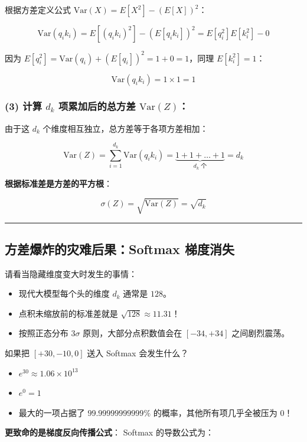 根据方差定义公式 $\text{Var}(X) = E[X^2] - (E[X])^2$：

\[
\text{Var}(q_i k_i) = E[(q_i k_i)^2] - (E[q_i k_i])^2 = E[q_i^2] E[k_i^2] - 0
\]

因为 $E[q_i^2] = \text{Var}(q_i) + (E[q_i])^2 = 1 + 0 = 1$，同理 $E[k_i^2] = 1$：

\[
\text{Var}(q_i k_i) = 1 \times 1 = 1
\]

\subsubsection{(3) 计算 $d_k$ 项累加后的总方差 $\text{Var}(Z)$：}

由于这 $d_k$ 个维度相互独立，总方差等于各项方差相加：

\[
\text{Var}(Z) = \sum_{i=1}^{d_k} \text{Var}(q_i k_i) = \underbrace{1 + 1 + \dots + 1}_{d_k \text{ 个}} = d_k
\]

\textbf{根据标准差是方差的平方根}：

\[
\sigma(Z) = \sqrt{\text{Var}(Z)} = \sqrt{d_k}
\]

\vspace{0.8em}\hrule\vspace{0.8em}

\subsection{方差爆炸的灾难后果：Softmax 梯度消失}

请看当隐藏维度变大时发生的事情：
\begin{itemize}
  \item 现代大模型每个头的维度 $d_k$ 通常是 \textbf{$128$}。
  \item 点积未缩放前的标准差就是 $\sqrt{128} \approx \mathbf{11.31}$！
  \item 按照正态分布 $3\sigma$ 原则，大部分点积数值会在 $[-34, +34]$ 之间剧烈震荡。
\end{itemize}

如果把 $[+30, -10, 0]$ 送入 Softmax 会发生什么？
\begin{itemize}
  \item $e^{30} \approx 1.06 \times 10^{13}$
  \item $e^{0} = 1$
  \item 最大的一项占据了 $99.99999999999\%$ 的概率，其他所有项几乎全被压为 $0$！
\end{itemize}

\textbf{更致命的是梯度反向传播公式}：
Softmax 的导数公式为：

